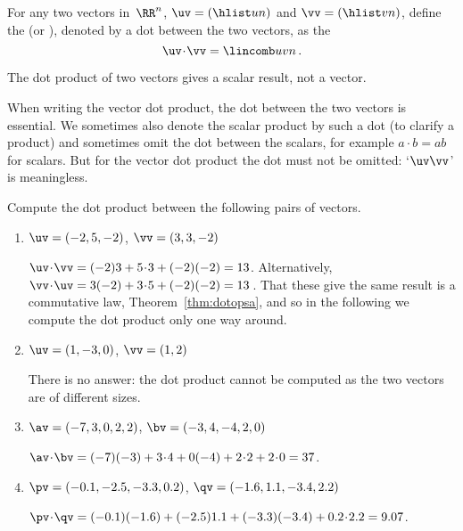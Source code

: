 \begin{definition} \label{def:dotprod}
For any two vectors in~\(\RR^n\), $\uv=(\hlist un)$ and $\vv=(\hlist vn)$,
define the  (or ), denoted by a dot between the two vectors, as the 
\begin{equation*}
\uv\cdot \vv= \lincomb uvn\,.
\end{equation*}
\end{definition}

The dot product of two vectors gives a scalar result, not a vector.

When writing the vector dot product, the dot between the two vectors is essential.
We sometimes also denote the scalar product by such a dot (to clarify a product) and sometimes omit the dot between the scalars, for example \(a\cdot b=ab\) for scalars. 
But for the vector dot product the dot must not be omitted: `\(\uv\vv\)' is meaningless.


\begin{example} \label{eg:}
Compute the dot product between the following pairs of vectors.
\begin{enumerate}
\item \(\uv=(-2,5,-2)\), \(\vv=(3,3,-2)\)
\begin{solution} 
\(\uv\cdot\vv=(-2)3+5\cdot3+(-2)(-2)=13\). 
Alternatively, \(\vv\cdot\uv=3(-2)+3\cdot5+(-2)(-2)=13\)\,.
That these give the same result is a commutative law, Theorem~\ref{thm:dotopsa}, and so in the following we compute the dot product only one way around.
\end{solution}

\item \(\uv=(1,-3,0)\), \(\vv=(1,2)\)
\begin{solution} 
There is no answer: the dot product cannot be computed as the two vectors are of different sizes. 
\end{solution}

\item \(\av=(-7,3,0,2,2)\), \(\bv=(-3,4,-4,2,0)\)
\begin{solution} 
\(\av\cdot\bv=(-7)(-3)+3\cdot4+0(-4)+2\cdot2+2\cdot0=37\). 
\end{solution}

\item \(\pv=(-0.1,-2.5,-3.3,0.2)\), \(\qv=(-1.6,1.1,-3.4,2.2)\)
\begin{solution} 
\(\pv\cdot\qv=(-0.1)(-1.6)+(-2.5)1.1+(-3.3)(-3.4)+0.2\cdot2.2=9.07\).
\end{solution}
\end{enumerate}
\end{example}





